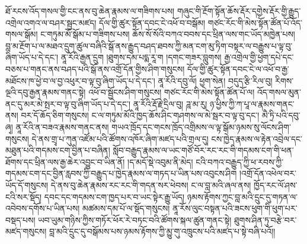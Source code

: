 \documentclass{article}
\begin{document}
ཐོ་རངས་འོད་གསལ་གྱི་ངང་ནས་བུ་ཆེན་རྣམས་ལ་གཟིགས་པས། གཞུང་གི་རྔོག་སྟོན་ཆོས་རྡོར་དགྱེས་རྡོར་གྱི་རྒྱུད་འགྲེལ་འགའ་ལ་བཤར་སྦྱང་མཛད། དོལ་གྱི་ཚུར་སྟོན་དབང་ངེ་འཕོ་བ་བསྒོམ། གཙང་རོང་གི་མེས་སྟོན་ཚོན་པོ་འོད་གསལ་སྒོམ། ང་གཏུམ་མོ་སྒོམ་པ་གཟིགས་པས། ཆོས་སོ་སོའི་བཀའ་བབས་དང་ཕྲིན་ལས་གང་ཡོད་མཁྱེན་པས། བླ་མ་རྔོག་པ་ལ་མཐའ་དྲུག་ཚུལ་བཞིའི་སྒོ་ནས་རྒྱུད་བཤད་ཐབས་ཀྱི་མན་ངག་མུ་ཏིག་བསྟར་ལ་བརྒྱུས་པ་ལྟ་བུ་ཞིག་ཡོད་པ་དེ་དང་། ནཱ་རོའི་རྒྱན་དྲུག །ཐུགས་དམ་པདྨ་རཱ་ག །དགང་གཟར་བླུགས། རྒྱ་འགྲེལ་གྱི་ཕྱག་དཔེ་དང་བཅས་པ་གནང་ནས་བཤད་པའི་སྒོ་ནས་འགྲོ་དོན་གྱིས་ཤིག་གསུངས། དོལ་གྱི་ཚུར་སྟོན་དབང་ངེ་ལ་འཕོ་བ་རྒྱ་མཐོངས་ཁ་ཕྱེ་བ་ལ་བྱ་འཕུར་བ་ལྟ་བུ་ཞིག་ཡོད་པ་དེ་དང་། ནཱ་རོའི་དབུ་ལོ། ཕྱག་སེན། བདུད་རྩི་རིལ་བུ། རིགས་ལྔའི་དབུ་རྒྱན་རྣམས་གནང་སྟེ། འཕོ་བ་སྦྱོངས་ཤིག་གསུངས། གཙང་རོང་གི་མེས་སྟོན་ཚོན་པོ་ལ། འོད་གསལ་མུན་ནང་དུ་མར་མེ་སྤར་བ་ལྟ་བུ་ཞིག་ཡོད་པ་དེ་དང་། ནཱ་རོའི་རྡོ་རྗེ་དྲིལ་བུ། ཌཱ་མ་རུ། ཉ་ཕྱིས་ཀྱི་ཀ་པཱ་ལ་རྣམས་གནང་ནས། བར་དོ་ཆོད་ཅིག་གསུངས། ང་ལ་གཏུམ་མོའི་ཁྱད་ཆོས་ཤིང་གཤགས་ལ་མེ་སྦར་བ་ལྟ་བུ་དང་། མཻ་ཏྲི་པའི་དབུ་ཞྭ། ནཱ་རོའི་ན་བཟའ་རྣམས་གནང་ནས། གཡའ་ཁྲོད་དང་གངས་ཁྲོད་འགྲིམས་ལ་ལྟ་སྒོམ་ཉམས་སུ་ལོངས་ཤིག་གསུངས། དེ་ནས་གྲྭ་པ་ཀུན་འཛོམ་པའི་ཚོགས་འཁོར་ཞིག་མཛད་པའི་གྲལ་དུ། ངས་ཁྱེད་རྣམས་ལ་རྟེན་འབྲེལ་དང་མཐུན་པའི་གདམས་ངག་བྱིན་པ་བཞིན། སློབ་བརྒྱུད་རྣམས་ལ་ཡང་གཙོ་བོར་རང་རང་གི་གདམས་ངག་གི་ཕན་ཐོགས་དང་ཕྲིན་ལས་རྒྱ་ཆེར་འབྱུང་བ་ཡིན་ནོ། །ད་མདོ་སྡེ་འབུམ་ནི་མེད། ངའི་བཀའ་བརྒྱུད་ཀྱི་ཕ་རབས་ཀྱི་གདམས་ངག་དང་བྱིན་རླབས་ཀྱི་བརྒྱུད་པ་ཁྱེད་རྣམས་ལ་གཏད་པ་ཡིན་པས་འབུངས་ཤིག །འགྲོ་དོན་འཕེལ་བར་ཡོད་དོ་གསུངས། དེ་ནས་བུ་ཆེན་རྣམས་རང་རང་གི་གདན་སར་ཕེབས། ང་ལ་བླ་མའི་ཞལ་ནས། ཁྱོད་རང་ལོ་ཤས་ངའི་སར་སྡོད། དབང་དང་གདམས་ངག་ཁྱད་པར་བ་ཡང་སྟེར་རྒྱུ་ཡོད། ཉམས་རྟོགས་ཀྱང་བླ་མའི་དྲུང་དུ་གཏན་ལ་འབེབས་དགོས་པ་ཡིན་པས། མཚམས་དམ་པོ་ལ་སྡོད་གསུངས། ནཱ་རོས་ལུང་བསྟན་པའི་ཟངས་ཕུག་གི་ཕུག་པར་བསྡད་པས། ཡབ་ཡུམ་གཉིས་ཀྱིས་གཏོར་ཕོར་རེ་བཏང་བའི་ཚོགས་སྐལ་ཚུན་གནང་སྟེ། ཐུགས་ཤིན་ཏུ་བརྩེ་བར་མཛད་གསུངས། བླ་མའི་དྲུང་དུ་བསྒོམས་པས་ཉམས་རྟོགས་ཀྱི་མྱུ་གུ་འཁྲུངས་པའི་མཛད་པ་སྟེ་བཞི་པའོ།།
\end{document}
